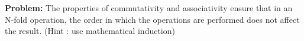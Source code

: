 \documentclass{article}
\begin{document}
\textbf{Problem:}
The properties of commutativity and associativity ensure that in an N-fold operation, the order in which the operations are performed does not affect the result.
(Hint : use mathematical induction) 
\end{document}

